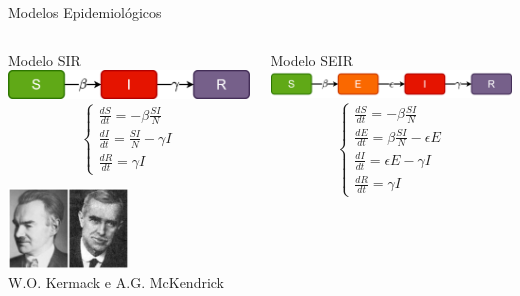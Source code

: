 \documentclass[pdf]
{beamer}
\begin{document}
\begin{frame}{Modelos Epidemiológicos}
\begin{columns}
	\begin{column}[T]{0.5\textwidth}
	\centering
		\vspace{0.2cm}
		\alert{\large Modelo SIR}\\
		\vspace{0.5cm}
		\includegraphics[width=\textwidth]{Imagens/SIR_diagram.png}\\
		\vspace{-0.2cm}
		\begin{equation*}
		    \begin{cases}
			    \frac{dS}{dt} = -\beta \frac{S I}{N}\\
			    \frac{dI}{dt} = \frac{S I}{N} - \gamma I\\
			    \frac{dR}{dt} = \gamma I
		    \end{cases}
		\end{equation*}
		
		\includegraphics[width=0.5\textwidth]{Imagens/Kermack-eta-A.-G.-McKendrick.jpg}\\
		\textcolor{ExecusharesGrey}{\tiny W.O. Kermack e A.G. McKendrick}\\
	\end{column}
	
	\begin{column}[T]{0.5\textwidth}
		\centering
		\vspace{1.8cm}
		\alert{\large Modelo SEIR}\\
		\vspace{0.5cm}
		\includegraphics[width=\textwidth]{Imagens/SEIR_diagram.png}\\
		\vspace{-0.2cm}
		\begin{equation*}
		    \begin{cases}
			    \frac{dS}{dt} = -\beta \frac{S I}{N}\\
			    \frac{dE}{dt} = \beta \frac{S I}{N} - \epsilon E\\
			    \frac{dI}{dt} = \epsilon E - \gamma I\\
			    \frac{dR}{dt} = \gamma I
		    \end{cases}
		\end{equation*}
		

\end{column}
\end{columns}
\end{frame}
\end{document}
